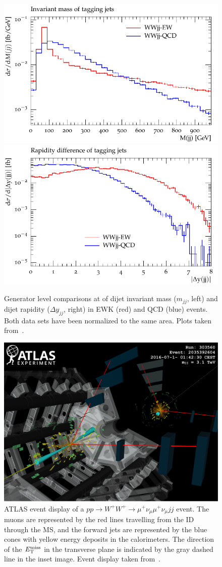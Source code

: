 \begin{figure}[htbp]
  \centering
  \includegraphics[width=.48\textwidth]{figs/ssww_13tev/introduction/Nm1_mjj}
  \includegraphics[width=.48\textwidth]{figs/ssww_13tev/introduction/Nm1_deltaY}
  \caption[Generator level comparisons at  of dijet invariant mass ($m_{jj}$, left) and dijet rapidity ($\Delta y_{jj}$, right) in EWK (red) and QCD (blue) \ssww events.  Both data sets have been normalized to the same area.]{Generator level comparisons at  of dijet invariant mass ($m_{jj}$, left) and dijet rapidity ($\Delta y_{jj}$, right) in EWK (red) and QCD (blue) \ssww events.  Both data sets have been normalized to the same area.  Plots taken from~\cite{2013.ssww-8tev-atlas-support}.}
  \label{fig:ssww13tev_dijet_comparison}
\end{figure}

\begin{figure}[htbp]
  \centering
  \includegraphics[width=.95\textwidth]{figs/ssww_13tev/introduction/evtdisplay_mm}
  \caption{ATLAS event display of a $pp\rightarrow W^{+}W^{+}\rightarrow\mu^{+}\nu_\mu\mu^{+}\nu_\mu jj$ event.  The muons are represented by the red lines travelling from the ID through the MS, and the forward jets are represented by the blue cones with yellow energy deposits in the calorimeters.  The direction of the $E_{\mathrm{T}}^{\mathrm{miss}}$ in the transverse plane is indicated by the gray dashed line in the inset image.  Event display taken from~\cite{2018.ssww-13tev-atlas-conf}.}
  \label{fig:ssww13tev_event_display_mm}
\end{figure}

